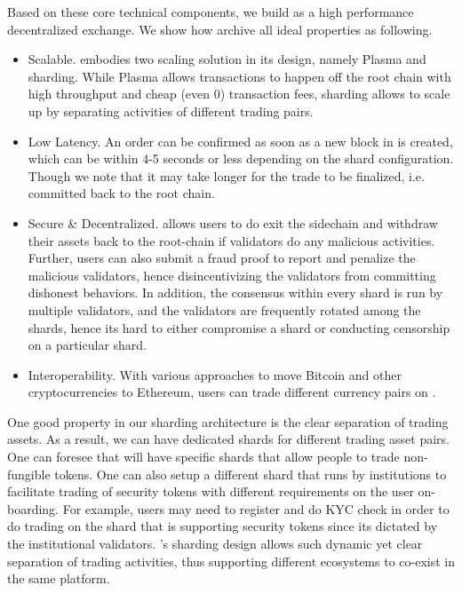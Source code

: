 Based on these core technical components, we build \codename as a high performance decentralized exchange. We show how \codename archive all ideal properties as following.
\begin{itemize}
\item Scalable. \codename embodies two scaling solution in its design, namely Plasma and sharding. While Plasma allows transactions to happen off the root chain with high throughput and cheap (even 0) transaction fees, sharding allows \codename to scale up by separating activities of different trading pairs.
\item Low Latency. An order can be confirmed as soon as a new block in \codename is created, which can be within 4-5 seconds or less depending on the shard configuration. Though we note that it may take longer for the trade to be finalized, i.e. committed back to the root chain.
\item Secure \& Decentralized. \codename allows users to do exit the sidechain and withdraw their assets back to the root-chain if validators do any malicious activities. Further, users can also submit a fraud proof to report and penalize the malicious validators, hence disincentivizing the validators from committing dishonest behaviors. In addition, the consensus within every shard is run by multiple validators, and the validators are frequently rotated among the shards, hence its hard to either compromise a shard or conducting censorship on a particular shard.
\item Interoperability. With various approaches to move Bitcoin and other cryptocurrencies to Ethereum, users can trade different currency pairs on \codename.
\end{itemize}

One good property in our sharding architecture is the clear separation of trading assets. As a result, we can have dedicated shards for different trading asset pairs. One can foresee that \codename will have specific shards that allow people to trade non-fungible tokens. One can also setup a different shard that runs by institutions to facilitate trading of security tokens with different requirements on the user on-boarding. For example, users may need to register and do KYC check in order to do trading on the shard that is supporting security tokens since its dictated by the institutional validators. \codename’s sharding design allows such dynamic yet clear separation of trading activities, thus supporting different ecosystems to co-exist in the same platform.

